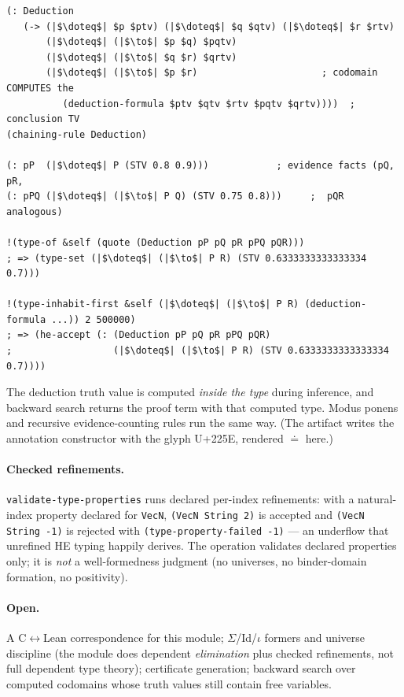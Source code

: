 \documentclass[11pt]{article}
\newcommand{\code}[1]{\texttt{#1}}
\begin{document}
\begin{lstlisting}[language={},basicstyle=\ttfamily\scriptsize,escapechar=|]
(: Deduction
   (-> (|$\doteq$| $p $ptv) (|$\doteq$| $q $qtv) (|$\doteq$| $r $rtv)
       (|$\doteq$| (|$\to$| $p $q) $pqtv)
       (|$\doteq$| (|$\to$| $q $r) $qrtv)
       (|$\doteq$| (|$\to$| $p $r)                      ; codomain COMPUTES the
          (deduction-formula $ptv $qtv $rtv $pqtv $qrtv))))  ; conclusion TV
(chaining-rule Deduction)

(: pP  (|$\doteq$| P (STV 0.8 0.9)))            ; evidence facts (pQ, pR,
(: pPQ (|$\doteq$| (|$\to$| P Q) (STV 0.75 0.8)))     ;  pQR analogous)

!(type-of &self (quote (Deduction pP pQ pR pPQ pQR)))
; => (type-set (|$\doteq$| (|$\to$| P R) (STV 0.6333333333333334 0.7)))

!(type-inhabit-first &self (|$\doteq$| (|$\to$| P R) (deduction-formula ...)) 2 500000)
; => (he-accept (: (Deduction pP pQ pR pPQ pQR)
;                  (|$\doteq$| (|$\to$| P R) (STV 0.6333333333333334 0.7))))
\end{lstlisting}

\noindent
The deduction truth value is computed \emph{inside the type} during
inference, and backward search returns the proof term with that
computed type.  Modus ponens and recursive evidence-counting rules run
the same way.  (The artifact writes the annotation constructor with the
glyph U+225E, rendered $\doteq$ here.)

\paragraph{Checked refinements.}  \code{validate-type-properties} runs
declared per-index refinements: with a natural-index property declared
for \code{VecN}, \code{(VecN String 2)} is accepted and
\code{(VecN String -1)} is rejected with
\code{(type-property-failed -1)} --- an underflow that unrefined HE
typing happily derives.  The operation validates declared properties
only; it is \emph{not} a well-formedness judgment (no universes, no
binder-domain formation, no positivity).

\paragraph{Open.}  A C$\leftrightarrow$Lean correspondence for this
module; $\Sigma$/Id/$\iota$ formers and universe discipline (the module
does dependent \emph{elimination} plus checked refinements, not full
dependent type theory); certificate generation; backward search over
computed codomains whose truth values still contain free variables.
\end{document}
